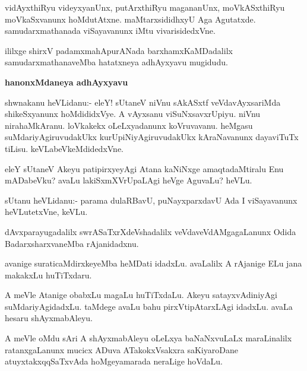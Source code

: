 \begin{mng}
vidAyxthiRyu videyxyanUnx, putArxthiRyu magananUnx, moVkASxthiRyu moVkaSxvanunx hoMdutAtxne. maMtarxsididhxyU Aga Agutatxde. samudarxmathanada viSayavanunx iMtu vivarisidedxVne.
\end{mng}
ililxge shirxV padamxmahApurANada barxhamxKaMDadalilx samudarxmathanaveMba hatatxneya adhAyxyavu mugidudu.

\begin{center}
\textbf{\large hanonxMdaneya adhAyxyavu}
\end{center}

\begin{mng}
shwnakanu heVLidanu:- eleY! sUtaneV niVnu sAkASxtf veVdavAyxsariMda shikeSxyanunx hoMdididxVye. A vAyxsanu viSuNxsavxrUpiyu. niVnu nirahaMkAranu. loVkakekx oLeLxyadanunx koVruvavanu. heMgasu suMdariyAgiruvudakUkx kurUpiNiyAgiruvudakUkx kAraNavanunx dayaviTuTx tiLisu. keVLabeVkeMdidedxVne.
\end{mng}

\begin{mng}
eleY sUtaneV Akeyu patipirxyeyAgi Atana kaNiNxge amaqtadaMtiralu Enu mADabeVku? avaLu lakiSxmXVrUpaLAgi heVge AguvaLu? heVLu.
\end{mng}

\begin{mng}
sUtanu heVLidanu:- parama dulaRBavU, puNayxparxdavU Ada I viSayavanunx heVLutetxVne, keVLu.
\end{mng}

\begin{mng}
dAvxparayugadalilx swrASaTxrXdeVshadalilx veVdaveVdAMgagaLanunx Odida BadarxsharxvaneMba rAjanidadxnu.
\end{mng}

\begin{mng}
avanige suraticaMdirxkeyeMba heMDati idadxLu. avaLalilx A rAjanige ELu jana makakxLu huTiTxdaru.
\end{mng}

\begin{mng}
A meVle Atanige obabxLu magaLu huTiTxdaLu. Akeyu satayxvAdiniyAgi suMdariyAgidadxLu. taMdege avaLu bahu pirxVtipAtarxLAgi idadxLu. avaLa hesaru shAyxmabAleyu.
\end{mng}

\begin{mng}
A meVle oMdu sAri A shAyxmabAleyu oLeLxya baNaNxvuLaLx maraLinalilx ratanxgaLanunx mucicx ADuva ATakokxVsakxra saKiyaroDane atuyxtakxqqSaTxvAda hoMgeyamarada neraLige hoVdaLu.
\end{mng}

